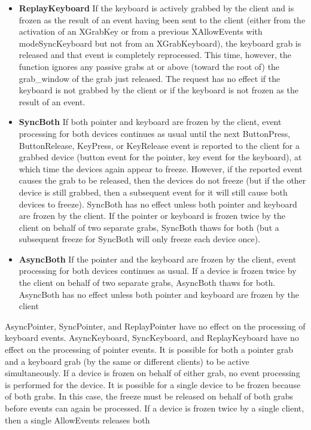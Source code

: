 \documentclass{report}
\begin{document}
\begin{itemize}
\begin{itemize}
                \item \textbf{ReplayKeyboard} If the keyboard is actively grabbed by the client and is frozen as the result of an event having been sent to the client (either from the activation of an XGrabKey or from a previous XAllowEvents with modeSyncKeyboard but not from an XGrabKeyboard), the keyboard grab is released and that event is completely reprocessed. This time, however, the function ignores any passive grabs at or above (toward the root of) the grab\_window of the grab just released. The request has no effect if the keyboard is not grabbed by the client or if the keyboard is not frozen as the result of an event.
                \item \textbf{SyncBoth} If both pointer and keyboard are frozen by the client, event processing for both devices continues as usual until the next ButtonPress, ButtonRelease, KeyPress, or KeyRelease event is reported to the client for a grabbed device (button event for the pointer, key event for the keyboard), at which time the devices again appear to freeze. However, if the reported event causes the grab to be released, then the devices do not freeze (but if the other device is still grabbed, then a subsequent event for it will still cause both devices to freeze). SyncBoth has no effect unless both pointer and keyboard are frozen by the client. If the pointer or keyboard is frozen twice by the client on behalf of two separate grabs, SyncBoth thaws for both (but a subsequent freeze for SyncBoth will only freeze each device once).
                \item \textbf{AsyncBoth} If the pointer and the keyboard are frozen by the client, event processing for both devices continues as usual. If a device is frozen twice by the client on behalf of two separate grabs, AsyncBoth thaws for both. AsyncBoth has no effect unless both pointer and keyboard are frozen by the client
            \end{itemize}
            AsyncPointer, SyncPointer, and ReplayPointer have no effect on the processing of keyboard events. AsyncKeyboard, SyncKeyboard, and ReplayKeyboard have no effect on the processing of pointer events. It is possible for both a pointer grab and a keyboard grab (by the same or different clients) to be active simultaneously. If a device is frozen on behalf of either grab, no event processing is performed for the device. It is possible for a single device to be frozen because of both grabs. In this case, the freeze must be released on behalf of both grabs before events can again be processed. If a device is frozen twice by a single client, then a single AllowEvents releases both

\end{itemize}
\end{document}
